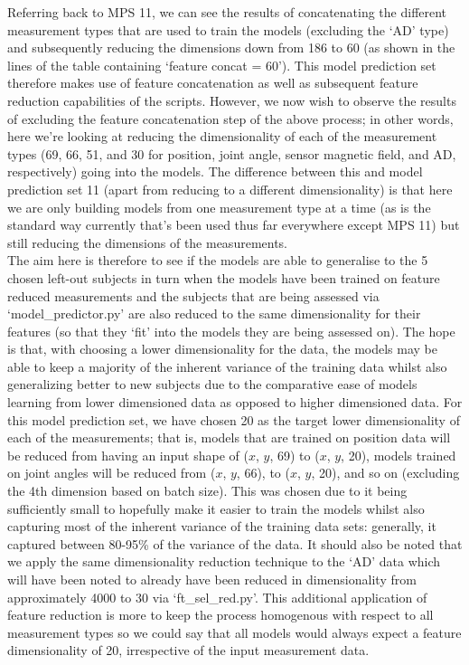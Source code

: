 \documentclass[12pt,twoside]{report}
\begin{document}
\quad Referring back to MPS 11, we can see the results of concatenating the different measurement types that are used to train the models (excluding the ‘AD’ type) and subsequently reducing the dimensions down from 186 to 60 (as shown in the lines of the table containing ‘feature concat = 60’). This model prediction set therefore makes use of feature concatenation as well as subsequent feature reduction capabilities of the scripts. However, we now wish to observe the results of excluding the feature concatenation step of the above process; in other words, here we’re looking at reducing the dimensionality of each of the measurement types (69, 66, 51, and 30 for position, joint angle, sensor magnetic field, and AD, respectively) going into the models. The difference between this and model prediction set 11 (apart from reducing to a different dimensionality) is that here we are only building models from one measurement type at a time (as is the standard way currently that’s been used thus far everywhere except MPS 11) but still reducing the dimensions of the measurements.\\

\quad The aim here is therefore to see if the models are able to generalise to the 5 chosen left-out subjects in turn when the models have been trained on feature reduced measurements and the subjects that are being assessed via ‘model\_predictor.py’ are also reduced to the same dimensionality for their features (so that they ‘fit’ into the models they are being assessed on). The hope is that, with choosing a lower dimensionality for the data, the models may be able to keep a majority of the inherent variance of the training data whilst also generalizing better to new subjects due to the comparative ease of models learning from lower dimensioned data as opposed to higher dimensioned data. For this model prediction set, we have chosen 20 as the target lower dimensionality of each of the measurements; that is, models that are trained on position data will be reduced from having an input shape of ($x$, $y$, 69) to ($x$, $y$, 20), models trained on joint angles will be reduced from ($x$, $y$, 66), to ($x$, $y$, 20), and so on (excluding the 4th dimension based on batch size). This was chosen due to it being sufficiently small to hopefully make it easier to train the models whilst also capturing most of the inherent variance of the training data sets: generally, it captured between 80-95\% of the variance of the data. It should also be noted that we apply the same dimensionality reduction technique to the ‘AD’ data which will have been noted to already have been reduced in dimensionality from approximately 4000 to 30 via ‘ft\_sel\_red.py’. This additional application of feature reduction is more to keep the process homogenous with respect to all measurement types so we could say that all models would always expect a feature dimensionality of 20, irrespective of the input measurement data.
\end{document}
